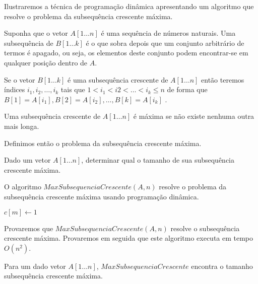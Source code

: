 Ilustraremos a técnica de programação dinâmica apresentando um algoritmo que resolve o problema da subsequência crescente máxima.

Suponha que o vetor $A[1 \ldots n]$ é uma sequência de números naturais. Uma subsequência de $B[1 \ldots k]$ é o que sobra depois que um conjunto arbitrário de termos é apagado, ou seja, os elementos deste conjunto podem encontrar-se em qualquer posição dentro de $A$.

Se o vetor $B[1 \ldots k]$ é uma subsequência crescente de $A[1 \ldots n]$ então teremos índices $i_1,i_2,\ldots,i_k$ tais que $1 < i_1 < i2 < \ldots < i_k \leq n$  de forma que $B[1] = A[i_1],  B[2] = A[i_2], \ldots ,  B[k] = A[i_k]$ .

Uma subsequência crescente de $A[1 \ldots n]$ é máxima se não existe nenhuma outra mais longa.

Definimos então o problema da subsequência crescente máxima.

\begin{definition}
Dado um vetor $A[1 \ldots n]$, determinar qual o tamanho de sua subsequência crescente máxima.
\end{definition}

O algoritmo $MaxSubsequenciaCrescente (A,n)$ resolve o problema da subsequência crescente máxima usando programação dinâmica.

\begin{algorithm}[H]
\SetAlgoLined
{}
{
    $c[m] \leftarrow 1$
    
}


\caption{$MaxSubsequenciaCrescente (A,n$)}
\label{alg:ssc}
\end{algorithm}

Provaremos que $MaxSubsequenciaCrescente (A,n)$ resolve o subsequência crescente máxima. Provaremos em seguida que este algoritmo executa em tempo $O( n ^ 2)$.

\begin{teorema}

Para um dado vetor $A[1 \ldots n]$, $MaxSubsequenciaCrescente$ encontra o tamanho subsequência crescente máxima.

\end {teorema}


